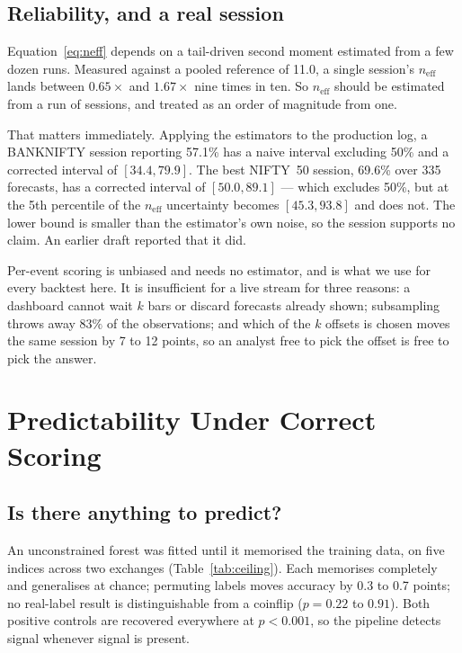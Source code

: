 \documentclass[sigconf,nonacm]{acmart}
\begin{document}
\subsection{Reliability, and a real session}

Equation~\eqref{eq:neff} depends on a tail-driven second moment estimated from a
few dozen runs. Measured against a pooled reference of 11.0, a single session's
$n_{\text{eff}}$ lands between $0.65\times$ and $1.67\times$ nine times in ten.
So $n_{\text{eff}}$ should be estimated from a run of sessions, and treated as
an order of magnitude from one.

That matters immediately. Applying the estimators to the production log, a
BANKNIFTY session reporting 57.1\% has a naive interval excluding 50\% and a
corrected interval of $[34.4, 79.9]$. The best NIFTY~50 session, 69.6\% over 335
forecasts, has a corrected interval of $[50.0, 89.1]$ --- which excludes 50\%,
but at the 5th percentile of the $n_{\text{eff}}$ uncertainty becomes
$[45.3, 93.8]$ and does not. The lower bound is smaller than the estimator's own
noise, so the session supports no claim. An earlier draft reported that it did.

Per-event scoring is unbiased and needs no estimator, and is what we use for
every backtest here. It is insufficient for a live stream for three reasons: a
dashboard cannot wait $k$ bars or discard forecasts already shown; subsampling
throws away $83\%$ of the observations; and which of the $k$ offsets is chosen
moves the same session by 7 to 12 points, so an analyst free to pick the offset
is free to pick the answer.

\section{Predictability Under Correct Scoring}
\label{sec:pred}

\subsection{Is there anything to predict?}

An unconstrained forest was fitted until it memorised the training data, on five
indices across two exchanges (Table~\ref{tab:ceiling}). Each memorises
completely and generalises at chance; permuting labels moves accuracy by 0.3 to
0.7 points; no real-label result is distinguishable from a coinflip
($p = 0.22$ to $0.91$). Both positive controls are recovered everywhere at
$p<0.001$, so the pipeline detects signal whenever signal is present.
\end{document}
